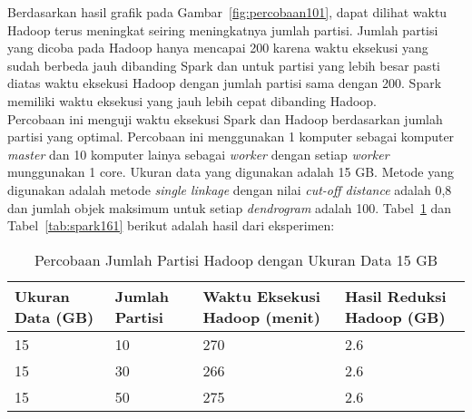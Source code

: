 Berdasarkan hasil grafik pada Gambar~\ref{fig:percobaan101}, dapat dilihat waktu Hadoop terus meningkat seiring meningkatnya jumlah partisi. Jumlah partisi yang dicoba pada Hadoop hanya mencapai 200 karena waktu eksekusi yang sudah berbeda jauh dibanding Spark dan untuk partisi yang lebih besar pasti diatas waktu eksekusi Hadoop dengan jumlah partisi sama dengan 200. Spark memiliki waktu eksekusi yang jauh lebih cepat dibanding Hadoop.  \\





Percobaan ini menguji waktu eksekusi Spark dan Hadoop berdasarkan jumlah partisi yang optimal. Percobaan ini menggunakan 1 komputer sebagai komputer \textit{master} dan 10 komputer lainya sebagai \textit{worker} dengan setiap \textit{worker} munggunakan 1 core. Ukuran data yang digunakan adalah 15 GB. Metode yang digunakan adalah metode \textit{single linkage} dengan nilai \textit{cut-off distance} adalah 0,8 dan jumlah objek maksimum untuk setiap \textit{dendrogram} adalah 100. Tabel~\ref{tab:spark151} dan Tabel~\ref{tab:spark161} berikut adalah hasil dari eksperimen:





\begin{table}[H] 
	\centering 
	\caption{Percobaan Jumlah Partisi Hadoop dengan Ukuran Data 15 GB}
	\label{tab:spark151}
	\begin{tabular}{|p{3cm}|p{3cm}|p{4cm}|p{4cm}|}
\hline
Ukuran Data (GB) & Jumlah Partisi &  Waktu Eksekusi Hadoop (menit) & Hasil Reduksi Hadoop (GB)\\
\hline
15 & 10 & 270  & 2.6  \\
\hline
15 & 30 & 266  & 2.6  \\
\hline
15 & 50 & 275  & 2.6  \\
\hline


\hline

	\end{tabular} 
\end{table}




